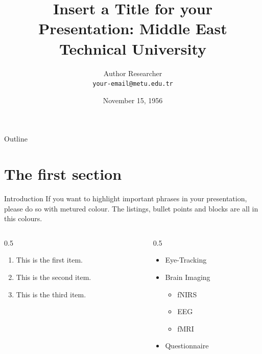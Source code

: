 \documentclass[aspectratio=43]{beamer}
\title{Insert a Title for your Presentation: Middle East Technical University}
\author{Author Researcher \\ \footnotesize{\texttt{your-email@metu.edu.tr}}}
\institute{Insert the name of the institute or event}
\date{November 15, 1956}
\begin{document}
\begin{frame}
\titlepage
\end{frame}


\begin{frame}[t]{Outline}
\color{metublack}
    \tableofcontents
\end{frame}

\section{The first section}

\begin{frame}[t]{Introduction}
    If you want to highlight \textcolor{metured}{important phrases} in your presentation, please do so with \textcolor{metured}{metured} colour. The listings, bullet points and blocks are all in this colours.
   
   \begin{columns}
   
   \begin{column}{0.5\textwidth}
   
   \begin{enumerate}
        \item This is the first item.
        \item This is the second item.
        \item This is the third item.
    \end{enumerate}
    
    \end{column}
    
    \begin{column}{0.5\textwidth}
    
    \begin{itemize}
        \item Eye-Tracking
        \item Brain Imaging
        \begin{itemize}
            \item fNIRS
            \item EEG
            \item fMRI
        \end{itemize}
        \item Questionnaire
    \end{itemize}
   \end{column}
   
   \end{columns}
\end{frame}
\end{document}
